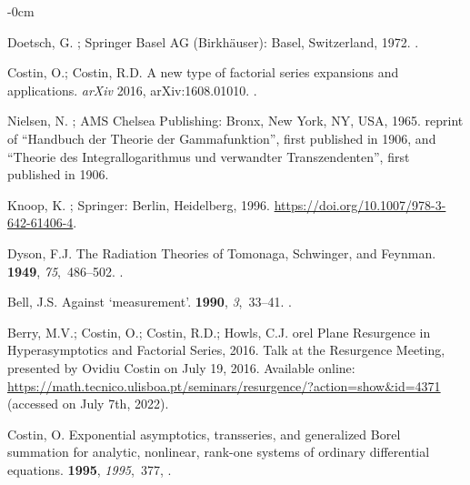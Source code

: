 \documentclass[axioms,article,accept,oneauthor,pdftex]{Definitions/mdpi}
\begin{document}
\begin{adjustwidth}{-\extralength}{0cm}
\begin{thebibliography}{999}
Doetsch, G.
; Springer Basel AG
  (Birkh\"auser): Basel, Switzerland, 1972.
.

Costin, O.; Costin, R.D.
\newblock A new type of factorial series expansions and applications. \emph{arXiv} 2016, arXiv:1608.01010.
.


Nielsen, N.
; AMS Chelsea Publishing: Bronx, New York,
  NY, USA, 1965.
\newblock reprint of ``Handbuch der Theorie der Gammafunktion'', first
  published in 1906, and ``Theorie des Integrallogarithmus und verwandter
  Transzendenten'', first published in 1906.


Knoop, K.
; Springer:
  Berlin, Heidelberg,  1996.
  {\url{https://doi.org/10.1007/978-3-642-61406-4}}.

Dyson, F.J.
\newblock The Radiation Theories of {T}omonaga, {S}chwinger, and {F}eynman.
 {\bf 1949}, {\em 75},~486--502.
.

Bell, J.S.
\newblock Against `measurement'.
 {\bf 1990}, {\em 3},~33--41.
.

Berry, M.V.; Costin, O.; Costin, R.D.; Howls, C.J.
orel Plane Resurgence in Hyperasymptotics and Factorial Series,
2016.
\newblock Talk at the {Resurgence Meeting}, presented by Ovidiu Costin on July   19, 2016.
\newblock  Available online: \url{ https://math.tecnico.ulisboa.pt/seminars/resurgence/?action=show&id=4371}
\newblock (accessed on July 7th, 2022).

Costin, O.
\newblock Exponential asymptotics, transseries, and generalized {B}orel
  summation for analytic, nonlinear, rank-one systems of ordinary differential
  equations.
 {\bf 1995}, {\em
  1995},~377, %
.


\end{thebibliography}
\end{adjustwidth}
\end{document}
